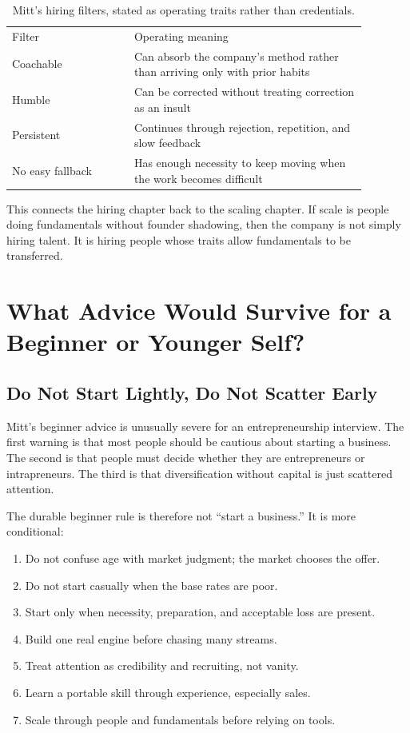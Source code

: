 \documentclass[11pt,oneside]{book}
\begin{document}
\begin{table}
\centering
\begin{tabular}{p{0.30\linewidth}p{0.58\linewidth}}
Filter & Operating meaning \\
Coachable & Can absorb the company's method rather than arriving only with prior habits \\
Humble & Can be corrected without treating correction as an insult \\
Persistent & Continues through rejection, repetition, and slow feedback \\
No easy fallback & Has enough necessity to keep moving when the work becomes difficult \\
\end{tabular}
\caption{Mitt's hiring filters, stated as operating traits rather than credentials.}
\end{table}

This connects the hiring chapter back to the scaling chapter. If scale is people doing fundamentals without founder shadowing, then the company is not simply hiring talent. It is hiring people whose traits allow fundamentals to be transferred.

\chapter{What Advice Would Survive for a Beginner or Younger Self?}

\section{Do Not Start Lightly, Do Not Scatter Early}

Mitt's beginner advice is unusually severe for an entrepreneurship interview. The first warning is that most people should be cautious about starting a business. The second is that people must decide whether they are entrepreneurs or intrapreneurs. The third is that diversification without capital is just scattered attention.

The durable beginner rule is therefore not ``start a business.'' It is more conditional:

\begin{enumerate}
\item Do not confuse age with market judgment; the market chooses the offer.
\item Do not start casually when the base rates are poor.
\item Start only when necessity, preparation, and acceptable loss are present.
\item Build one real engine before chasing many streams.
\item Treat attention as credibility and recruiting, not vanity.
\item Learn a portable skill through experience, especially sales.
\item Scale through people and fundamentals before relying on tools.
\end{enumerate}
\end{document}
